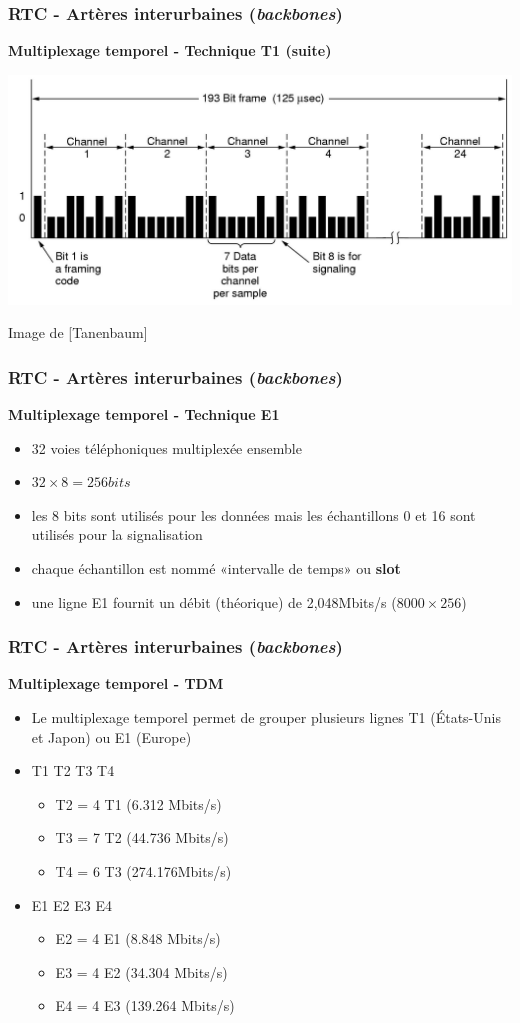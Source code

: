 \begin{frame}[fragile]
	\frametitle{RTC - Artères interurbaines (\textit{backbones})}
{\large\bf Multiplexage temporel - Technique T1 (suite)}
\begin{center}
	\includegraphics[width=.8\linewidth]{img/2-26-old.jpg}
	\par{\scriptsize Image de [Tanenbaum]} 
\end{center}
\end{frame}

\begin{frame}[fragile]
	\frametitle{RTC - Artères interurbaines (\textit{backbones})}
{\large\bf Multiplexage temporel - Technique E1}
\begin{itemize}
	\item 32 voies téléphoniques multiplexée ensemble
	\item $32\times 8 = 256 bits$
	\item les 8 bits sont utilisés pour les données mais les échantillons 0 et 16 
	sont utilisés pour la signalisation
	\item chaque échantillon est nommé «intervalle de temps» ou \textbf{slot}
	\item une ligne E1 fournit un débit (théorique) de 2,048Mbits/s ($8000\times
	256$) 
\end{itemize}
\end{frame}

\begin{frame}[fragile]
  \frametitle{RTC - Artères interurbaines (\textit{backbones})}
{\large\bf Multiplexage temporel - TDM}
\begin{itemize}
	\item Le multiplexage temporel permet de grouper plusieurs lignes T1 (États-Unis et Japon) 
	ou E1 (Europe)
	\item T1 T2 T3 T4
	\begin{itemize}
		\item T2 = 4 T1 (6.312 Mbits/s)
		\item T3 = 7 T2 (44.736 Mbits/s)
		\item T4 = 6 T3 (274.176Mbits/s)
	\end{itemize}
	\item E1 E2 E3 E4
	\begin{itemize}
		\item E2 = 4 E1 (8.848 Mbits/s)
		\item E3 = 4 E2 (34.304 Mbits/s)
		\item E4 =  4 E3 (139.264 Mbits/s)
	\end{itemize}
\end{itemize}
\end{frame}

